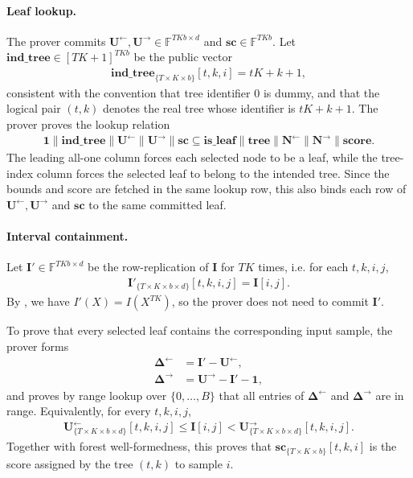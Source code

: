 \paragraph{Leaf lookup.}
The prover commits
$\mathbf{U}^{\leftarrow},\mathbf{U}^{\rightarrow}\in\mathbb{F}^{TKb\times d}$
and $\mathbf{sc}\in\mathbb{F}^{TKb}$.
Let $\mathbf{ind\_tree}\in[TK+1]^{TKb}$ be the public vector
\begin{align}
    \mathbf{ind\_tree}_{\{T\times K\times b\}}[t,k,i] = tK+k+1,
\end{align}
consistent with the convention that tree identifier $0$ is dummy, and that the
logical pair $(t,k)$ denotes the real tree whose identifier is $tK+k+1$.
The prover proves the lookup relation
\begin{align}
    \mathbf{1}\|\mathbf{ind\_tree}\|
    \mathbf{U}^{\leftarrow}\|\mathbf{U}^{\rightarrow}\|\mathbf{sc}
    \subseteq
    \mathbf{is\_leaf}\|\mathbf{tree}\|
    \mathbf{N}^{\leftarrow}\|\mathbf{N}^{\rightarrow}\|\mathbf{score}.
\end{align}
The leading all-one column forces each selected node to be a leaf, while the
tree-index column forces the selected leaf to belong to the intended tree.
Since the bounds and score are fetched in the same lookup row, this also binds
each row of $\mathbf{U}^{\leftarrow},\mathbf{U}^{\rightarrow}$ and
$\mathbf{sc}$ to the same committed leaf.

\paragraph{Interval containment.}
    Let $\mathbf{I}'\in\mathbb{F}^{TKb\times d}$ be the row-replication of $\mathbf{I}$ for $TK$ times, i.e. for each $t,k,i,j$,
    \begin{align}
        \mathbf{I}'_{\{T\times K\times b\times d\}}[t,k,i,j]
        =
        \mathbf{I}[i,j].
    \end{align}
    By , we have
    $I'(X) = I(X^{TK})$,
    so the prover does not need to commit $\mathbf{I}'$.

To prove that every selected leaf contains the corresponding input sample, the
prover forms
\begin{align}
    \pmb{\Delta}^{\leftarrow}
    &=
    \mathbf{I}'-\mathbf{U}^{\leftarrow},\\
    \pmb{\Delta}^{\rightarrow}
    &=
    \mathbf{U}^{\rightarrow}-\mathbf{I}'-\mathbf{1},
\end{align}
and proves by range lookup over $\{0,\ldots,B\}$ that all entries of
$\pmb{\Delta}^{\leftarrow}$ and
$\pmb{\Delta}^{\rightarrow}$ are in range.
Equivalently, for every $t,k,i,j$,
\begin{align}
    \mathbf{U}^{\leftarrow}_{\{T\times K\times b\times d\}}[t,k,i,j]
    \leq
    \mathbf{I}[i,j]
    <
    \mathbf{U}^{\rightarrow}_{\{T\times K\times b\times d\}}[t,k,i,j].
\end{align}
Together with forest well-formedness, this proves that
$\mathbf{sc}_{\{T\times K\times b\}}[t,k,i]$ is the score assigned by the
tree $(t,k)$ to sample $i$.

